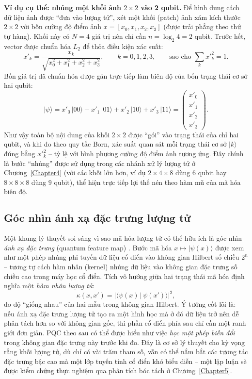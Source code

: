\noindent\textbf{Ví dụ cụ thể: nhúng một khối ảnh $2\times 2$ vào 2 qubit.} Để hình dung cách dữ liệu ảnh được ``đưa vào lượng tử'', xét một khối (patch) ảnh xám kích thước $2\times 2$ với bốn cường độ điểm ảnh $x=[x_0, x_1, x_2, x_3]$ (được trải phẳng theo thứ tự hàng). Khối này có $N=4$ giá trị nên chỉ cần $n=\log_2 4 = 2$ qubit. Trước hết, vector được chuẩn hóa $L_2$ để thỏa điều kiện xác suất:
\begin{equation}
    x'_k = \frac{x_k}{\sqrt{x_0^2 + x_1^2 + x_2^2 + x_3^2}}, \qquad k=0,1,2,3,
    \qquad \text{sao cho } \sum_{k} x'^{2}_k = 1.
\end{equation}
Bốn giá trị đã chuẩn hóa được gán trực tiếp làm biên độ của bốn trạng thái cơ sở hai qubit:
\begin{equation}
    |\psi\rangle = x'_0\,|00\rangle + x'_1\,|01\rangle + x'_2\,|10\rangle + x'_3\,|11\rangle
    = \begin{pmatrix} x'_0 \\ x'_1 \\ x'_2 \\ x'_3 \end{pmatrix}.
\end{equation}
Như vậy toàn bộ nội dung của khối $2\times 2$ được ``gói'' vào trạng thái của chỉ hai qubit, và khi đo theo quy tắc Born, xác suất quan sát mỗi trạng thái cơ sở $|k\rangle$ đúng bằng $x'^{2}_k$ -- tỷ lệ với bình phương cường độ điểm ảnh tương ứng. Đây chính là bước ``nhúng'' được sử dụng trong các nhánh xử lý lượng tử ở Chương~\ref{Chapter4} (với các khối lớn hơn, ví dụ $2\times 4\times 8$ dùng $6$ qubit hay $8\times 8\times 8$ dùng $9$ qubit), thể hiện trực tiếp lợi thế nén theo hàm mũ của mã hóa biên độ.

\subsection{Góc nhìn ánh xạ đặc trưng lượng tử}
\label{subsec:qfeaturemap}
Một khung lý thuyết soi sáng vì sao mã hóa lượng tử có thể hữu ích là góc nhìn \emph{ánh xạ đặc trưng} (quantum feature map) \cite{havlicek2019supervised, schuld2019featurehilbert}. Bước mã hóa $x\mapsto|\psi(x)\rangle$ được xem như một phép nhúng phi tuyến dữ liệu cổ điển vào không gian Hilbert số chiều $2^n$ -- tương tự cách hàm nhân (kernel) nhúng dữ liệu vào không gian đặc trưng số chiều cao trong máy học cổ điển. Tích vô hướng giữa hai trạng thái mã hóa định nghĩa một \emph{hàm nhân lượng tử}:
\begin{equation}
    \kappa(x, x') = \big|\langle \psi(x)\,|\,\psi(x')\rangle\big|^2,
\end{equation}
đo độ ``giống nhau'' của hai mẫu trong không gian Hilbert. Ý tưởng cốt lõi là: nếu ánh xạ đặc trưng lượng tử tạo ra một hình học mà ở đó dữ liệu trở nên dễ phân tách hơn so với không gian gốc, thì phần cổ điển phía sau chỉ cần một ranh giới đơn giản. PQC theo sau có thể được hiểu như việc \emph{học một phép biến đổi} trong không gian đặc trưng này trước khi đo. Đây là cơ sở lý thuyết cho kỳ vọng rằng khối lượng tử, dù chỉ có vài trăm tham số, vẫn có thể nắm bắt các tương tác đặc trưng bậc cao mà một lớp tuyến tính cổ điển khó biểu diễn -- một lập luận sẽ được kiểm chứng thực nghiệm qua phân tích bóc tách ở Chương~\ref{Chapter5}.

